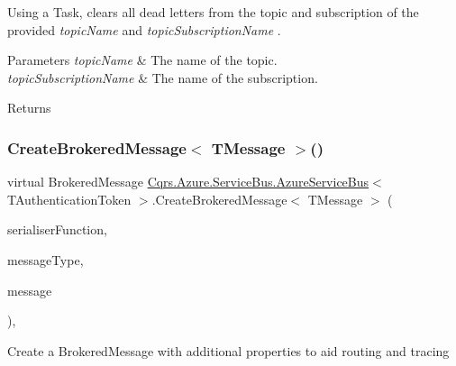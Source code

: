 Using a Task, clears all dead letters from the topic and subscription of the provided {\itshape topic\+Name}  and {\itshape topic\+Subscription\+Name} . 


\begin{DoxyParams}{Parameters}
{\em topic\+Name} & The name of the topic.\\
\hline
{\em topic\+Subscription\+Name} & The name of the subscription.\\
\hline
\end{DoxyParams}
\begin{DoxyReturn}{Returns}

\end{DoxyReturn}
\mbox{\label{classCqrs_1_1Azure_1_1ServiceBus_1_1AzureServiceBus_abd7070403c94e0b404ffa00c07c94a50_abd7070403c94e0b404ffa00c07c94a50}} 
\subsubsection{\texorpdfstring{Create\+Brokered\+Message$<$ T\+Message $>$()}{CreateBrokeredMessage< TMessage >()}}
{\footnotesize\ttfamily virtual Brokered\+Message \hyperlink{classCqrs_1_1Azure_1_1ServiceBus_1_1AzureServiceBus}{Cqrs.\+Azure.\+Service\+Bus.\+Azure\+Service\+Bus}$<$ T\+Authentication\+Token $>$.Create\+Brokered\+Message$<$ T\+Message $>$ (\begin{DoxyParamCaption}\item[{Func$<$ T\+Message, string $>$}]{serialiser\+Function,  }\item[{Type}]{message\+Type,  }\item[{T\+Message}]{message }\end{DoxyParamCaption})\hspace{0.3cm}{\ttfamily [protected]}, {\ttfamily [virtual]}}



Create a Brokered\+Message with additional properties to aid routing and tracing 

\mbox{\label{classCqrs_1_1Azure_1_1ServiceBus_1_1AzureServiceBus_a6efd119a61f555a4a8c456f4821e83bf_a6efd119a61f555a4a8c456f4821e83bf}} 
